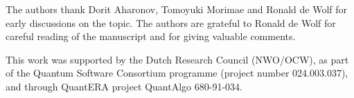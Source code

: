 \documentclass[a4paper, onecolumn, accepted=2022-08-28]{quantumarticle}
\begin{document}
\begin{acknowledgments}
The authors thank Dorit Aharonov, Tomoyuki Morimae and Ronald de Wolf for early discussions on the topic.
The authors are grateful to Ronald de Wolf for careful reading of the manuscript and for giving valuable comments.

This work was supported by the Dutch Research Council (NWO/OCW), as part of the Quantum Software Consortium programme (project number 024.003.037), and through QuantERA project QuantAlgo 680-91-034.
\end{acknowledgments}


%



\clearpage


\end{document}

